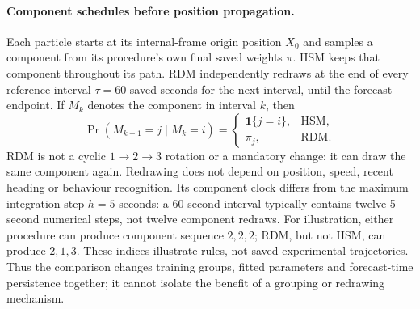 \paragraph{Component schedules before position propagation.}
Each particle starts at its internal-frame origin position $X_0$ and samples
a component from its procedure's own final saved weights $\pi$.
HSM keeps that component throughout its path. RDM independently
redraws at the end of every reference interval $\tau=60$ saved seconds for
the next interval, until the forecast endpoint. If $M_k$ denotes the component
in interval $k$, then
\begin{equation}\label{eq:mode-update-rules}
 \Pr(M_{k+1}=j\mid M_k=i)=
 \begin{cases}\mathbf1\{j=i\},&\text{HSM},\\ \pi_j,&\text{RDM}.
 \end{cases}
\end{equation}
RDM is not a cyclic $1\to2\to3$ rotation or a mandatory change: it can draw
the same component again. Redrawing does not depend on position, speed,
recent heading or behaviour recognition. Its component clock differs from
the maximum integration step $h=5$ seconds: a 60-second interval typically
contains twelve 5-second numerical steps, not twelve component redraws.
For illustration, either procedure can produce component sequence $2,2,2$;
RDM, but not HSM, can produce $2,1,3$. These indices illustrate rules,
not saved experimental trajectories. Thus the comparison changes training
groups, fitted parameters and forecast-time persistence together; it cannot
isolate the benefit of a grouping or redrawing mechanism.

